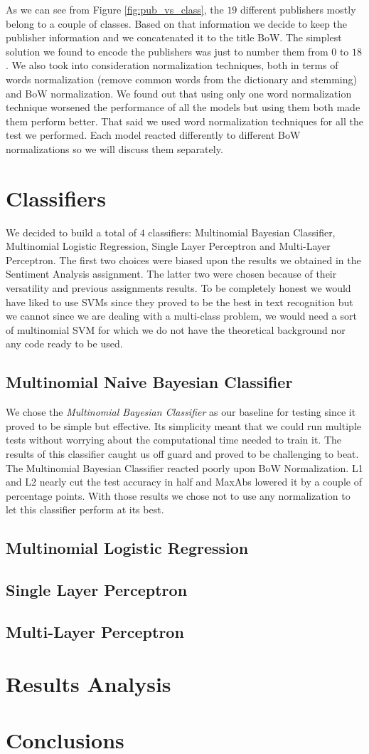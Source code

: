 \documentclass[10pt,a4paper]{report}
\begin{document}
As we can see from Figure \ref{fig:pub_vs_class}, the $19$ different publishers mostly belong to a couple of classes. Based on that information we decide to keep the publisher information and we concatenated it to the title BoW. The simplest solution we found to encode the publishers was just to number them from $0$ to $18$. We also took into consideration normalization techniques, both in terms of words normalization (remove common words from the dictionary and stemming) and BoW normalization. We found out that using only one word normalization technique worsened the performance of all the models but using them both made them perform better. That said we used word normalization techniques for all the test we performed. Each model reacted differently to different BoW normalizations so we will discuss them separately.  
\section{Classifiers}
We decided to build a total of $4$ classifiers: Multinomial Bayesian Classifier, Multinomial Logistic Regression, Single Layer Perceptron and Multi-Layer Perceptron. The first two choices were biased upon the results we obtained in the Sentiment Analysis assignment. The latter two were chosen because of their versatility and previous assignments results. To be completely honest we would have liked to use SVMs since they proved to be the best in text recognition but we cannot since we are dealing with a multi-class problem, we would need a sort of multinomial SVM for which we do not have the theoretical background nor any code ready to be used. 
\subsection{Multinomial Naive Bayesian Classifier}
We chose the \textit{Multinomial Bayesian Classifier} as our baseline for testing since it proved to be simple but effective. Its simplicity meant that we could run multiple tests without worrying about the computational time needed to train it. The results of this classifier caught us off guard and proved to be challenging to beat. The Multinomial Bayesian Classifier reacted poorly upon BoW Normalization. L1 and L2 nearly cut the test accuracy in half and MaxAbs lowered it by a couple of percentage points. With those results we chose not to use any normalization to let this classifier perform at its best.
\subsection{Multinomial Logistic Regression}
\subsection{Single Layer Perceptron}
\subsection{Multi-Layer Perceptron}
\section{Results Analysis}
\section{Conclusions}
\end{document}

